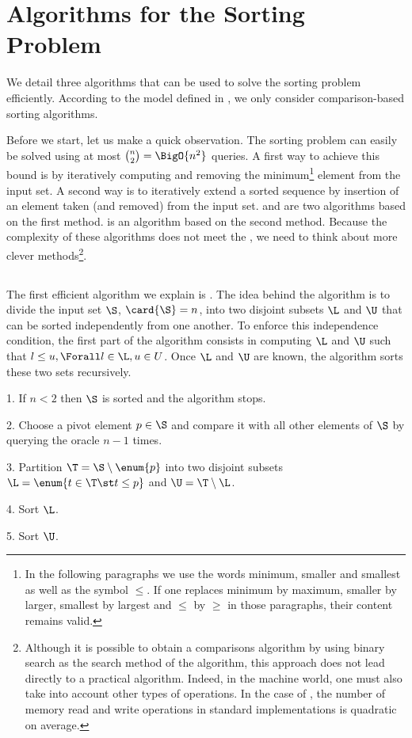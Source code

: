 \section{Algorithms for the Sorting Problem}
\label{tree:sorting:alg}

We detail three algorithms that can be used to solve the sorting
problem efficiently. According to the model defined in ,
we only consider comparison-based sorting algorithms.

Before we start, let us make a quick observation. The sorting problem can
easily be solved using at most \(\binom{n}{2} = \BigO{n^2}\) queries. A first
way to achieve this bound is by iteratively computing and removing the
minimum\footnote{In the following paragraphs we use the words minimum,
smaller
and smallest as well as the symbol \(\le\). If one replaces minimum by maximum,
smaller by larger, smallest by largest and \(\le\) by \(\ge\) in those paragraphs,
their content remains valid.}
element from the input set. A second way is to iteratively
extend a sorted sequence by insertion of an element taken (and removed) from
the input set. \selectionsort and \bubblesort are two algorithms based on the
first method. \insertionsort is an algorithm based on the second method.
Because the complexity of these algorithms does not meet the \ITLB, we need
to think about more clever methods\footnote{Although it is possible to obtain
a  comparisons algorithm by using binary search as the search
method of the \insertionsort algorithm, this approach does not lead directly to
a practical algorithm. Indeed, in the machine world, one must also take into
account other types of operations. In the case of \insertionsort,
the number of memory read and write operations in standard implementations is
quadratic on average.}.

\subsection{\quicksort}
The first efficient algorithm we explain is \quicksort \cite{hoare:1962}.
The idea behind the \quicksort algorithm is to divide the input set \(\S\),
\(\card{\S} = n\), into two disjoint subsets \(\L\) and \(\U\) that can be
sorted independently from one another. To enforce this independence condition,
the first part of the algorithm consists in computing \(\L\) and \(\U\) such
that \(l \le u, \Forall l \in \L, u \in U\). Once \(\L\) and \(\U\) are known,
the algorithm sorts these two sets recursively.
\begin{algorithm}[\quicksort]
\item[1.] If \(n < 2\) then \(\S\) is sorted and the algorithm stops.
\item[2.] Choose a pivot element \(p \in \S\) and compare it with all other
elements of \(\S\) by querying the oracle \(n - 1\) times.
\item[3.] Partition \(\T = \S \setminus \enum{p}\) into two disjoint subsets
\(\L = \enum{t \in \T \st t \le p}\) and \(\U = \T \setminus \L\).
\item[4.] Sort \(\L\).
\item[5.] Sort \(\U\).
\end{algorithm}

